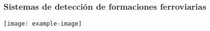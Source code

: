 \subsubsection{Sistemas de detección de formaciones ferroviarias}

\lipsum[1]

\lipsum[1]
\texttt{[image: example-image]}
\lipsum[1]